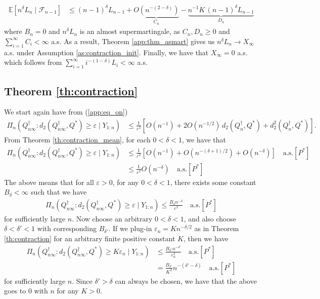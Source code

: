\documentclass[11pt,a4paper]{article}
\newcommand{\E}{\mathbb{E}}
\begin{document}
\begin{appendices}
\begin{align*}
   \E[n^{\delta} L_{n} \mid \mathcal{F}_{n-1}] &\leq (n-1)^\delta L_{n-1} +\underbrace{O\left(n^{-(2-\delta)}\right)}_{C_n} - \underbrace{n^{-1}K\, (n-1)^\delta L_{n-1} }_{D_n}
\end{align*}
where $B_n = 0$ and $n^{\delta}L_n$ is an almost supermartingale, as $C_n, D_n \geq 0$ and $\sum_{i = 1}^\infty C_i <\infty$ a.s. As a result, {Theorem \ref{app:thm_asmart}} gives us $n^{\delta} L_n \to X_\infty$ a.s. under {Assumption \ref{as:contraction_init}}. Finally, we have that $X_\infty = 0$ a.s. which follows from $\sum_{i=1}^\infty i^{-(1-\delta)} L_{i} < \infty$ a.s. \\

\subsection{Theorem  \ref{th:contraction}}

We start again have from (\ref{app:eq_on})
\begin{align*}
    \Pi_n \left(Q^{\dagger}_{n\infty}: d_2\left(Q^{\dagger}_{n\infty}, Q^*\right) \geq \varepsilon  \mid Y_{1:n}\right)
    &\leq \frac{1}{\varepsilon^2}\left[O(n^{-1}) + 2O(n^{-1/2}) \, d_2(Q^{\dagger}_n,Q^*) + d_2^2(Q^{\dagger}_n,Q^*)\right].
\end{align*}
From {Theorem \ref{th:contraction_mean}}, for each $0 < \delta <1$, we have that
\begin{align*}
    \Pi_n \left(Q^{\dagger}_{n\infty}: d_2\left(Q^{\dagger}_{n\infty}, Q^*\right) \geq \varepsilon  \mid Y_{1:n}\right) 
    &\leq \frac{1}{\varepsilon^2}\left[O(n^{-1}) + O(n^{-(\delta+1)/2}) + O(n^{-\delta})\right] \quad \text{a.s.}[P^*]\\
    &\leq  \frac{1}{\varepsilon^2} O(n^{-\delta}) \quad \text{a.s.}[P^*]
\end{align*}
The above means that for all $\varepsilon > 0$, for any $0<\delta < 1$, there exists some constant $B_{\delta} < \infty$ such that  we have 
\begin{align*}
    \Pi_n \left(Q^{\dagger}_{n\infty}: d_2(Q_{n\infty}^{\dagger},Q^*) \geq \varepsilon \mid Y_{1:n}\right) \leq \frac{B_\delta n^{-\delta}}{\varepsilon^2} \quad \text{a.s.}[P^*]
\end{align*}
for sufficiently large $n$.
Now choose an arbitrary $0 < \delta < 1$, and also choose $\delta < \delta' < 1$ with corresponding $B_{\delta'}$. If we plug-in $\varepsilon_n = K n^{-\delta/2}$ as in {Theorem \ref{th:contraction}} for an arbitrary finite positive constant $K$, then we have
\begin{align*}
     \Pi_n (Q^{\dagger}_{n\infty}: d_2(Q_{n\infty}^{\dagger},Q^*) \geq K\varepsilon_n \mid Y_{1:n}) &\leq \frac{B_{\delta'}n^{-\delta'}}{\varepsilon_n^2}  \quad \text{a.s.}[P^*] \\
     &= \frac{B_{\delta'}}{K^2}n^{-\left(\delta' - \delta\right)} \quad \text{a.s.}[P^*]
\end{align*}
for sufficiently large $n$. Since $\delta' > \delta$ can always be chosen, we have that the above goes to 0 with $n$ for any $K>0$.




\end{appendices}
\end{document}
